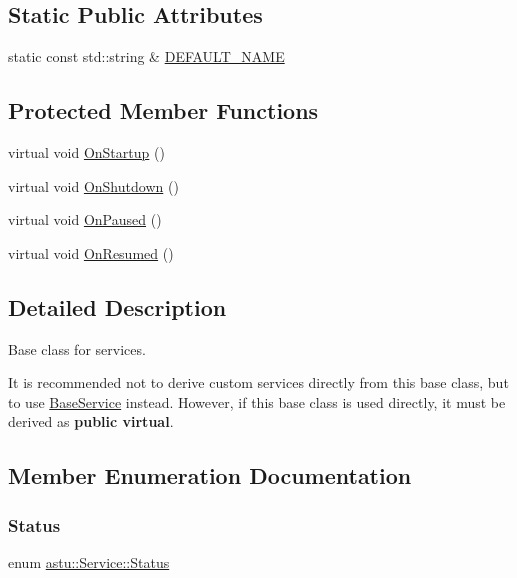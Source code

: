 \subsection*{Static Public Attributes}
\begin{DoxyCompactItemize}
\item 
static const std\+::string \& \hyperlink{classastu_1_1Service_a8bb66bb984aa9490026232b193896634}{D\+E\+F\+A\+U\+L\+T\+\_\+\+N\+A\+ME}
\end{DoxyCompactItemize}
\subsection*{Protected Member Functions}
\begin{DoxyCompactItemize}
\item 
virtual void \hyperlink{classastu_1_1Service_a357dc663e000b1f086f681ec3c459bfe}{On\+Startup} ()
\item 
virtual void \hyperlink{classastu_1_1Service_a1e1dff727df791c57fae782d8a613c5f}{On\+Shutdown} ()
\item 
virtual void \hyperlink{classastu_1_1Service_af6795fd14c86f340dd5e46e667ffae75}{On\+Paused} ()
\item 
virtual void \hyperlink{classastu_1_1Service_ac2817af2aa2f3a51ca230b9438d8f192}{On\+Resumed} ()
\end{DoxyCompactItemize}


\subsection{Detailed Description}
Base class for services.

It is recommended not to derive custom services directly from this base class, but to use \hyperlink{classastu_1_1BaseService}{Base\+Service} instead. However, if this base class is used directly, it must be derived as {\bfseries public virtual}. 

\subsection{Member Enumeration Documentation}
\mbox{\label{classastu_1_1Service_a5ef3b0bb1fb8a504afe708ee4dd8371e}} 
\subsubsection{\texorpdfstring{Status}{Status}}
{\footnotesize\ttfamily enum \hyperlink{classastu_1_1Service_a5ef3b0bb1fb8a504afe708ee4dd8371e}{astu\+::\+Service\+::\+Status}}


